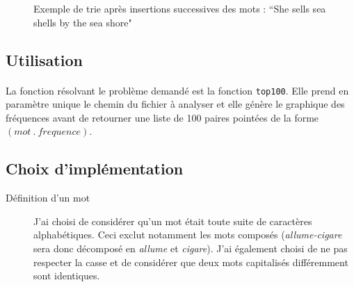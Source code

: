 \documentclass{article}
\begin{document}
\begin {figure}[H]
   \label{fig:trie}
   \caption{Exemple de trie après insertions successives des mots : ``She sells sea shells by the sea shore"}
\end{figure}

\subsection*{Utilisation}
\paragraph{}
La fonction résolvant le problème demandé est la fonction \verb#top100#. Elle prend en paramètre 
unique le chemin du fichier à analyser et elle génère le graphique des fréquences avant de retourner
une liste de 100 paires pointées de la forme $(mot ~ . ~ frequence)$. 

\subsection*{Choix d'implémentation}
\begin{description}

\item [Définition d'un mot] J'ai choisi de considérer qu'un mot était toute suite de caractères
alphabétiques. Ceci exclut notamment les mots composés (\emph{allume-cigare} sera donc décomposé en
\emph{allume} et \emph{cigare}). J'ai également choisi de ne pas respecter la casse et de considérer que deux mots
capitalisés différemment sont identiques.

\item []

\end{description}
\end{document}
